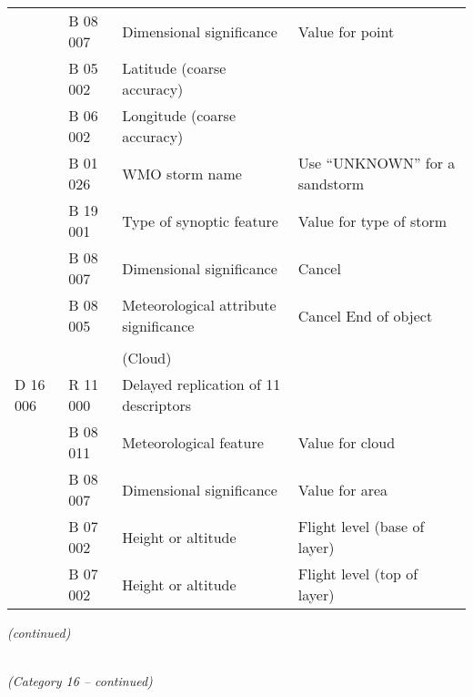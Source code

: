 \begin{longtable}[]{@{}llll@{}}
& B 08 007 & Dimensional significance & Value for point\tabularnewline
& B 05 002 & Latitude (coarse accuracy) &\tabularnewline
& B 06 002 & Longitude (coarse accuracy) &\tabularnewline
& B 01 026 & WMO storm name & Use ``UNKNOWN'' for a sandstorm\tabularnewline
& B 19 001 & Type of synoptic feature & Value for type of storm\tabularnewline
& B 08 007 & Dimensional significance & Cancel\tabularnewline
& B 08 005 & Meteorological attribute significance & Cancel \textbar{} End of object\tabularnewline
& & &\tabularnewline
& & (Cloud) &\tabularnewline
D 16 006 & R 11 000 & Delayed replication of 11 descriptors &\tabularnewline
& B 08 011 & Meteorological feature & Value for cloud\tabularnewline
& B 08 007 & Dimensional significance & Value for area\tabularnewline
& B 07 002 & Height or altitude & Flight level (base of layer)\tabularnewline
& B 07 002 & Height or altitude & Flight level (top of layer)\tabularnewline
\bottomrule
\end{longtable}

\emph{(continued)}

\emph{\\
(Category 16 -- continued)}

